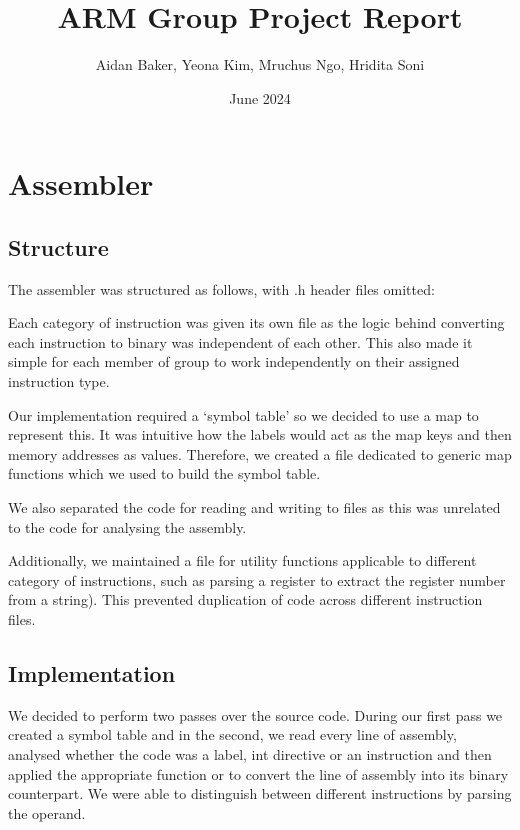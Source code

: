\documentclass{article}
\title{ARM Group Project Report}
\author{Aidan Baker, Yeona Kim, Mruchus Ngo, Hridita Soni}
\date{June 2024}
\begin{document}
\maketitle

\tableofcontents

\section{Assembler}

\subsection{Structure}
The assembler was structured as follows, with .h header files omitted:

Each category of instruction was given its own file as the logic behind converting each instruction to binary was independent of each other. This also made it simple for each member of group to work independently on their assigned instruction type.

Our implementation required a ‘symbol table’ so we decided to use a map to represent this. It was intuitive how the labels would act as the map keys and then memory addresses as values. Therefore, we created a file dedicated to generic map functions which we used to build the symbol table. 

We also separated the code for reading and writing to files as this was unrelated to the code for analysing the assembly.

Additionally, we maintained a file for utility functions applicable to different category of instructions, such as parsing a register to extract the register number from a string). This prevented duplication of code across different instruction files.

\subsection{Implementation}

We decided to perform two passes over the source code. During our first pass we created a symbol table and in the second, we read every line of assembly, analysed whether the code was a label, int directive or an instruction and then applied the appropriate function or to convert the line of assembly into its binary counterpart. We were able to distinguish between different instructions by parsing the operand.
\end{document}
